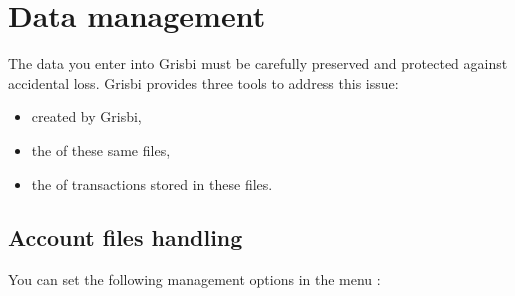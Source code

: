 
\chapter{Data management\label{datamanagement}}


The data you enter into Grisbi must be carefully preserved and protected against accidental loss. Grisbi provides three tools to address this issue:
\begin{itemize}
	\item {} created by Grisbi,
	\item the  of these same files,
	\item the  of transactions stored in these files.
\end{itemize}

\section{Account files handling\label{datamanagement-files}}

You can set the following management options in the menu :

